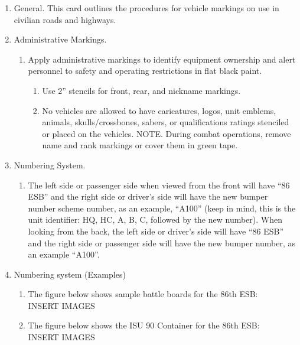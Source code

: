 \documentclass{article}
\begin{document}
\begin{enumerate}
    \item General.   This card outlines the procedures for vehicle markings on use in civilian roads and highways.

\item Administrative Markings.
\begin{enumerate}
    \item Apply administrative markings to identify equipment ownership and alert personnel to safety and operating restrictions in flat black paint. 
\begin{enumerate}
    \item Use 2” stencils for front, rear, and nickname markings.
\item No vehicles are allowed to have caricatures, logos, unit emblems, animals, skulls/crossbones, sabers, or qualifications ratings stenciled or placed on the vehicles.  
NOTE.   During combat operations, remove name and rank markings or cover them in green tape.
\end{enumerate}
\end{enumerate}

\item Numbering System.
\begin{enumerate}
    \item The left side or passenger side when viewed from the front will have “86 ESB” and the right side or driver’s side will have the new bumper number scheme number, as an example, “A100”  (keep in mind, this is the unit identifier:  HQ, HC, A, B, C, followed by the new number).   When looking from the back, the left side or driver’s side will have “86 ESB” and the right side or passenger side will have the new bumper number, as an example “A100”. 
\end{enumerate}
\item Numbering system (Examples)
\begin{enumerate}
    \item 	The figure below shows sample battle boards for the 86th ESB:
\\
INSERT IMAGES
\\
\item The figure below shows the ISU 90 Container for the 86th ESB:
\\
INSERT IMAGES
\end{enumerate}


\end{enumerate}
\end{document}

